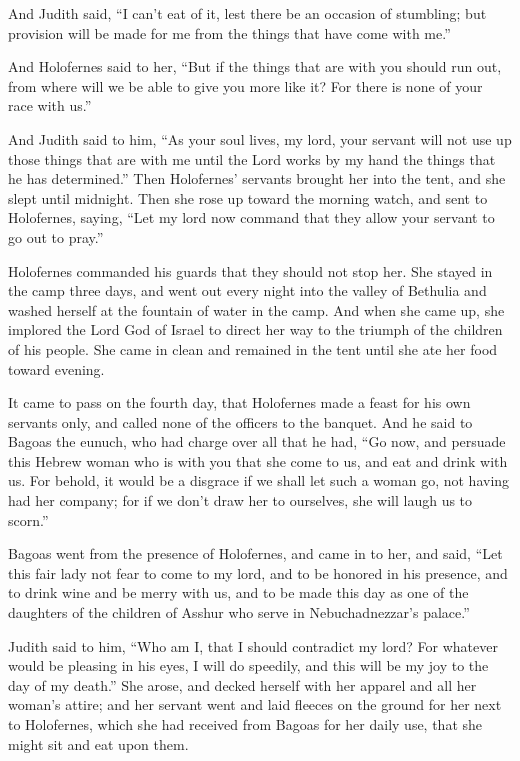  And Judith said, ``I can't eat of it, lest there be an
occasion of stumbling; but provision will be made for me from the things
that have come with me.''

 And Holofernes said to her, ``But if the things that are
with you should run out, from where will we be able to give you more
like it? For there is none of your race with us.''

 And Judith said to him, ``As your soul lives, my lord,
your servant will not use up those things that are with me until the
Lord works by my hand the things that he has determined.''
 Then Holofernes' servants brought her into the tent, and
she slept until midnight. Then she rose up toward the morning watch,
 and sent to Holofernes, saying, ``Let my lord now command
that they allow your servant to go out to pray.''

 Holofernes commanded his guards that they should not stop
her. She stayed in the camp three days, and went out every night into
the valley of Bethulia and washed herself at the fountain of water in
the camp.  And when she came up, she implored the Lord God
of Israel to direct her way to the triumph of the children of his
people.  She came in clean and remained in the tent until
she ate her food toward evening.

 It came to pass on the fourth day, that Holofernes made
a feast for his own servants only, and called none of the officers to
the banquet.  And he said to Bagoas the eunuch, who had
charge over all that he had, ``Go now, and persuade this Hebrew woman
who is with you that she come to us, and eat and drink with us.
 For behold, it would be a disgrace if we shall let such
a woman go, not having had her company; for if we don't draw her to
ourselves, she will laugh us to scorn.''

 Bagoas went from the presence of Holofernes, and came in
to her, and said, ``Let this fair lady not fear to come to my lord, and
to be honored in his presence, and to drink wine and be merry with us,
and to be made this day as one of the daughters of the children of
Asshur who serve in Nebuchadnezzar's palace.''

 Judith said to him, ``Who am I, that I should contradict
my lord? For whatever would be pleasing in his eyes, I will do speedily,
and this will be my joy to the day of my death.''  She
arose, and decked herself with her apparel and all her woman's attire;
and her servant went and laid fleeces on the ground for her next to
Holofernes, which she had received from Bagoas for her daily use, that
she might sit and eat upon them.

